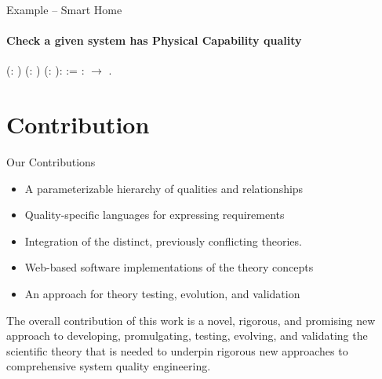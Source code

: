 \documentclass[xcolor=x11names,compress]{beamer}
\renewcommand{\(}{\begin{columns}}
\renewcommand{\)}{\end{columns}}
\newcommand{\<}[1]{\begin{column}{#1}}
\renewcommand{\>}{\end{column}}
\begin{document}
\begin{frame}{Example -- Smart Home}
\framesubtitle{Check a given system has Physical Capability quality}
\begin{coqdoccode}
\small{
\coqdocnoindent
{}  (: ) (: ) (: ):  := \coqdoceol
\coqdocindent{1.00em}
:      \ensuremath{\rightarrow}    .\coqdoceol
}
\end{coqdoccode}
\end{frame}


\section{Contribution}
\begin{frame}{Our Contributions}
\begin{itemize}
		\item A parameterizable hierarchy of qualities and relationships
		\item Quality-specific languages for expressing  requirements
		\item Integration of the distinct, previously conflicting theories.
		\item Web-based software implementations of the theory concepts
		\item An approach for theory testing, evolution, and validation
\end{itemize}
\vspace{0.5cm}		
		The overall contribution of this work is a novel, rigorous, and promising new approach to developing, promulgating, testing, evolving, and validating the scientific theory that is needed to underpin rigorous new approaches to comprehensive system quality engineering.
\end{frame}
\end{document}
